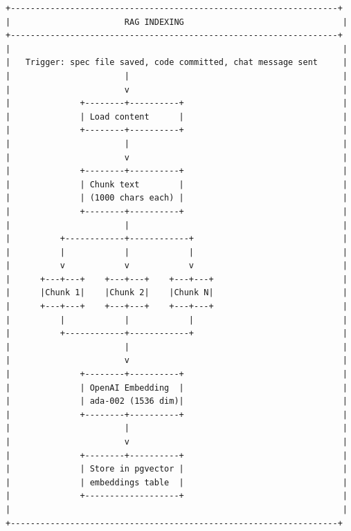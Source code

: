 \documentclass[11pt,a4paper]{article}
\begin{document}
\begin{verbatim}
+------------------------------------------------------------------+
|                       RAG INDEXING                                |
+------------------------------------------------------------------+
|                                                                   |
|   Trigger: spec file saved, code committed, chat message sent     |
|                       |                                           |
|                       v                                           |
|              +--------+----------+                                |
|              | Load content      |                                |
|              +--------+----------+                                |
|                       |                                           |
|                       v                                           |
|              +--------+----------+                                |
|              | Chunk text        |                                |
|              | (1000 chars each) |                                |
|              +--------+----------+                                |
|                       |                                           |
|          +------------+------------+                              |
|          |            |            |                              |
|          v            v            v                              |
|      +---+---+    +---+---+    +---+---+                          |
|      |Chunk 1|    |Chunk 2|    |Chunk N|                          |
|      +---+---+    +---+---+    +---+---+                          |
|          |            |            |                              |
|          +------------+------------+                              |
|                       |                                           |
|                       v                                           |
|              +--------+----------+                                |
|              | OpenAI Embedding  |                                |
|              | ada-002 (1536 dim)|                                |
|              +--------+----------+                                |
|                       |                                           |
|                       v                                           |
|              +--------+----------+                                |
|              | Store in pgvector |                                |
|              | embeddings table  |                                |
|              +-------------------+                                |
|                                                                   |
+------------------------------------------------------------------+
\end{verbatim}
\end{document}
